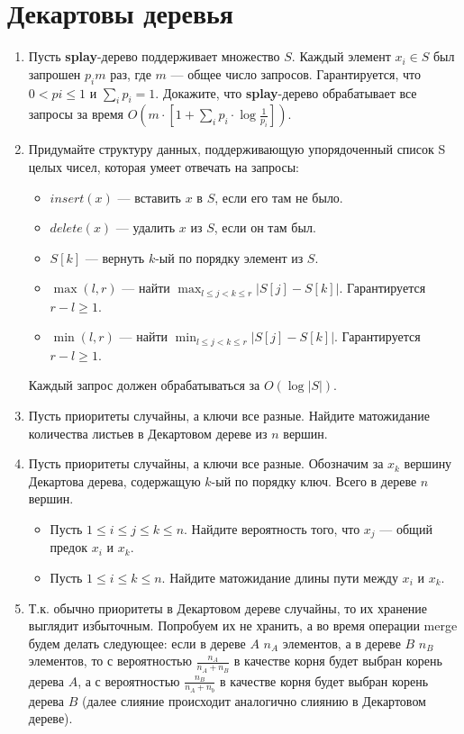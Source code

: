 \section*{Декартовы деревья}
\begin{enumerate}
	\item Пусть \textbf{splay}-дерево поддерживает множество $S$. Каждый элемент $x_i \in S$ был запрошен $p_im$ раз, где $m$ — общее число запросов. 
	Гарантируется, что $0 < pi \leqslant 1$ и $\sum_ip_i = 1$. Докажите, что \textbf{splay}-дерево обрабатывает все запросы за время $O(m\cdot \left[1 + \sum_ip_i\cdot \log \frac{1}{p_i} \right])$.

	\item Придумайте структуру данных, поддерживающую упорядоченный список S целых чисел, которая
	умеет отвечать на запросы:
	\begin{itemize}
		\item $insert(x)$ — вставить $x$ в $S$, если его там не было.
		\item $delete(x)$ — удалить $x$ из $S$, если он там был.
		\item $S[k]$ — вернуть $k$-ый по порядку элемент из $S$.
		\item $\max(l, r)$ — найти $\max_{l\leqslant j<k\leqslant r} |S[j] - S[k]|$. Гарантируется $r - l \geqslant 1$.
		\item $\min(l, r)$ — найти $\min_{l\leqslant j<k\leqslant r} |S[j] - S[k]|$. Гарантируется $r - l \geqslant 1$.
	\end{itemize}
	
	Каждый запрос должен обрабатываться за $O(\log |S|)$.
	
	\item Пусть приоритеты случайны, а ключи все разные. Найдите матожидание количества листьев в
	Декартовом дереве из $n$ вершин.
	
	\item Пусть приоритеты случайны, а ключи все разные. Обозначим за $x_k$ вершину Декартова дерева,	содержащую $k$-ый по порядку ключ. Всего в дереве $n$ вершин.
	\begin{itemize}
		\item Пусть $1 \leqslant i \leqslant j \leqslant k \leqslant n$. Найдите вероятность того, что $x_j$ — общий предок $x_i$ и $x_k$.
		\item Пусть $1 \leqslant i \leqslant k \leqslant n$. Найдите матожидание длины пути между $x_i$ и $x_k$.
	\end{itemize}
	
	\item Т.к. обычно приоритеты в Декартовом дереве случайны, то их хранение выглядит избыточным.
	Попробуем их не хранить, а во время операции merge будем делать следующее: если в дереве
	$A$ $n_A$ элементов, а в дереве $B$ $n_B$ элементов, то с вероятностью 
	$\frac{n_A}{n_A + n_B}$ в качестве корня будет выбран корень дерева $A$, а с вероятностью 
	$\frac{n_B}{n_A + n_b}$ в качестве корня будет выбран корень дерева $B$ (далее слияние 
	происходит аналогично слиянию в Декартовом дереве).
	

\end{enumerate}
